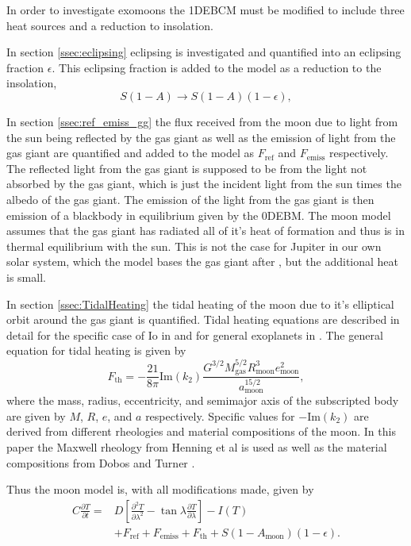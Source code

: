 \documentclass[12pt, onecolumn]{revtex4-2}    %
\newcommand{\partialderiv}[2]{\frac{\partial {#1}}{\partial {#2}}}
\newcommand{\partialderivsecnd}[2]{\frac{\partial^2 {#1}}{\partial {#2}^2}}
\begin{document}
In order to investigate exomoons the 1DEBCM must be modified to include three heat sources and a reduction to insolation.

In section \ref{ssec:eclipsing} eclipsing is investigated and quantified into an eclipsing fraction $\epsilon$.
This eclipsing fraction is added to the model as a reduction to the insolation,
\begin{equation}
  S(1-A) \to S(1-A)(1-\epsilon),
  \label{eq:reduction_insolation}
\end{equation}

In section \ref{ssec:ref_emiss_gg} the flux received from the moon due to light from the sun being reflected by the gas giant as well as the emission of light from the gas giant are quantified and added to the model as $F_\text{ref}$ and $F_\text{emiss}$ respectively.
The reflected light from the gas giant is supposed to be from the light not absorbed by the gas giant, which is just the incident light from the sun times the albedo of the gas giant.
The emission of the light from the gas giant is then emission of a blackbody in equilibrium given by the 0DEBM.
The moon model assumes that the gas giant has radiated all of it's heat of formation and thus is in thermal equilibrium with the sun.
This is not the case for Jupiter in our own solar system, which the model bases the gas giant after \cite{LJW2018}, but the additional heat is small.

In section \ref{ssec:TidalHeating} the tidal heating of the moon due to it's elliptical orbit around the gas giant is quantified.
Tidal heating equations are described in detail for the specific case of Io in \cite{YP1981, Segatz1988} and for general exoplanets in \cite{DobosTurner2015, DHT2017}.
The general equation for tidal heating is given by
\begin{equation}
  F_\text{th} = -\frac{21}{8\pi} \text{Im}(k_2) \frac{G^{3/2} M_\text{gas}^{5/2} R_\text{moon}^{3} e_\text{moon}^2}{a_\text{moon}^{15/2}},
  \label{eq:tidalheating_flux}
\end{equation}
where the mass, radius, eccentricity, and semimajor axis of the subscripted body are given by $M$, $R$, $e$, and $a$ respectively.
Specific values for $-\text{Im}(k_2)$ are derived from different rheologies and material compositions of the moon.
In this paper the Maxwell rheology from Henning et al \cite{Henning2009} is used as well as the material compositions from Dobos and Turner \cite{DobosTurner2015}.

Thus the moon model is, with all modifications made, given by
\begin{equation}
  \begin{split}
    C \partialderiv{T}{t} =& D\left[\partialderivsecnd{T}{\lambda} - \tan\lambda\partialderiv{T}{\lambda}\right] - I(T) \\
    & + F_\text{ref} + F_\text{emiss} + F_\text{th} + S(1-A_\text{moon})(1-\epsilon).
  \end{split}
  \label{eq:1DEBCM_moon}
\end{equation}
\end{document}
